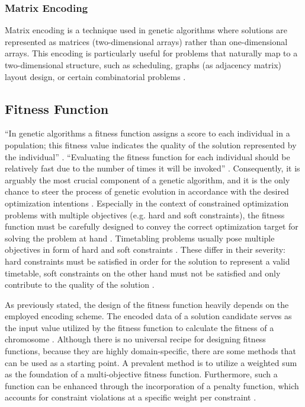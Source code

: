 \documentclass[sigconf]{acmart}
\begin{document}
\subsubsection{Matrix Encoding}
Matrix encoding is a technique used in genetic algorithms where solutions are
represented as matrices (two-dimensional arrays) rather than one-dimensional
arrays. This encoding is particularly useful for problems that
naturally map to a two-dimensional structure, such as scheduling, graphs
(as adjacency matrix) layout design, or certain combinatorial problems
\cite{Affenzeller2009}.



\subsection{Fitness Function}
\enquote{In genetic algorithms a fitness function assigns a score to each
individual in a population; this fitness value indicates the quality of the
solution represented by the individual} \cite{Affenzeller2009}.
\enquote{Evaluating the fitness function for each individual should be
relatively fast due to the number of times it will be invoked}
\cite{Affenzeller2009}.
Consequently, it is arguably the most crucial component of a genetic algorithm,
and it is the only chance to steer the process of genetic evolution in
accordance with the desired optimization intentions
\cite{Beligiannis2009,kinnear1994perspective}.
Especially in the context of constrained optimization problems with multiple
objectives (e.g. hard and soft constraints), the fitness function must be
carefully designed to convey the correct optimization target for solving the
problem at hand \cite{Beligiannis2009,Carr2014}.
Timetabling problems usually pose multiple objectives in form of hard and
soft constraints \cite{Beligiannis2009}. These differ in their severity:
hard constraints must be satisfied in order for the solution to represent a
valid timetable, soft constraints on the other hand must not be satisfied and
only contribute to the quality of the solution \cite{Beligiannis2009}.

As previously stated, the design of the fitness function heavily depends on the
employed encoding scheme. The encoded data of a solution candidate serves as
the input value utilized by the fitness function to calculate the fitness of a
chromosome \cite{Affenzeller2009}. Although there is no universal recipe for
designing fitness functions, because they are highly domain-specific,
there are some methods that can be used as a starting point.
A prevalent method is to utilize a weighted sum as the foundation of a
multi-objective fitness function. Furthermore, such a function can be enhanced
through the incorporation of a penalty function, which accounts for constraint
violations at a specific weight per constraint \cite{Beligiannis2009}.
\end{document}
